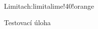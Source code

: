 \begin{chapterintro}{Limita}{ch:limita}{lime!40!orange}{}
\end{chapterintro}

\begin{exercise}
    Testovací úloha
\end{exercise}